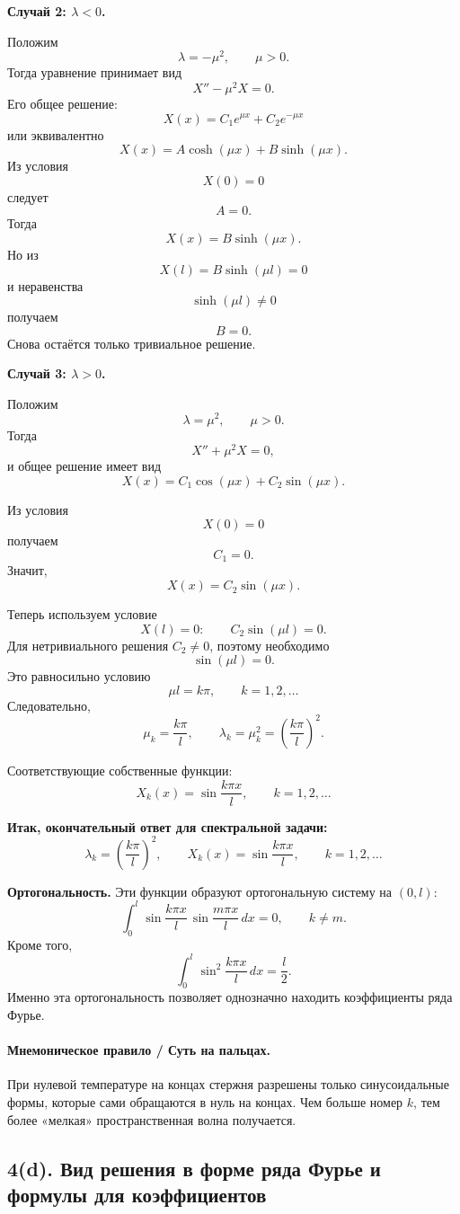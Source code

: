 \documentclass[a4paper,12pt]{article}
\begin{document}
\textbf{Случай 2: \texorpdfstring{$\lambda<0$}{lambda<0}.}

Положим
\[
\lambda=-\mu^2,
\qquad
\mu>0.
\]
Тогда уравнение принимает вид
\[
X''-\mu^2X=0.
\]
Его общее решение:
\[
X(x)=C_1e^{\mu x}+C_2e^{-\mu x}
\]
или эквивалентно
\[
X(x)=A\cosh(\mu x)+B\sinh(\mu x).
\]
Из условия
\[
X(0)=0
\]
следует
\[
A=0.
\]
Тогда
\[
X(x)=B\sinh(\mu x).
\]
Но из
\[
X(l)=B\sinh(\mu l)=0
\]
и неравенства
\[
\sinh(\mu l)\ne 0
\]
получаем
\[
B=0.
\]
Снова остаётся только тривиальное решение.

\textbf{Случай 3: \texorpdfstring{$\lambda>0$}{lambda>0}.}

Положим
\[
\lambda=\mu^2,
\qquad
\mu>0.
\]
Тогда
\[
X''+\mu^2X=0,
\]
и общее решение имеет вид
\[
X(x)=C_1\cos(\mu x)+C_2\sin(\mu x).
\]

Из условия
\[
X(0)=0
\]
получаем
\[
C_1=0.
\]
Значит,
\[
X(x)=C_2\sin(\mu x).
\]

Теперь используем условие
\[
X(l)=0:
\qquad
C_2\sin(\mu l)=0.
\]
Для нетривиального решения $C_2\ne 0$, поэтому необходимо
\[
\sin(\mu l)=0.
\]
Это равносильно условию
\[
\mu l=k\pi,
\qquad
k=1,2,\dots
\]
Следовательно,
\[
\mu_k=\frac{k\pi}{l},
\qquad
\lambda_k=\mu_k^2=\left(\frac{k\pi}{l}\right)^2.
\]

Соответствующие собственные функции:
\[
X_k(x)=\sin\frac{k\pi x}{l},
\qquad
k=1,2,\dots
\]

\textbf{Итак, окончательный ответ для спектральной задачи:}
\[
\lambda_k=\left(\frac{k\pi}{l}\right)^2,
\qquad
X_k(x)=\sin\frac{k\pi x}{l},
\qquad
k=1,2,\dots
\]

\textbf{Ортогональность.}
Эти функции образуют ортогональную систему на $(0,l)$:
\[
\int_0^l
\sin\frac{k\pi x}{l}\,
\sin\frac{m\pi x}{l}\,dx
=0,
\qquad
k\ne m.
\]
Кроме того,
\[
\int_0^l \sin^2\frac{k\pi x}{l}\,dx=\frac{l}{2}.
\]
Именно эта ортогональность позволяет однозначно находить коэффициенты ряда Фурье.

\paragraph{Мнемоническое правило / Суть на пальцах.}
При нулевой температуре на концах стержня разрешены только синусоидальные формы, которые сами обращаются в нуль на концах. Чем больше номер $k$, тем более «мелкая» пространственная волна получается.

\subsection*{4(d). Вид решения в форме ряда Фурье и формулы для коэффициентов}
\end{document}
